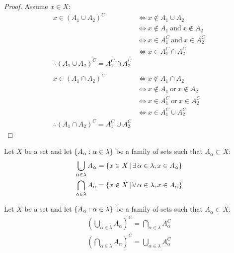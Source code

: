 \documentclass[letterpaper,12pt,fleqn]{article}
\renewcommand{\a}{\alpha}
\renewcommand{\l}{\lambda}
\begin{document}
\begin{proof}
  Assume \(x\in X\):
  \begin{align*}
    x\in(A_1\cup A_2)^C &\iff x\notin A_1\cup A_2 \\
    &\iff x\notin A_1\ \text{and}\ x\notin A_2 \\
    &\iff x\in A_1^C\ \text{and}\ x\in A_2^C \\
    &\iff x\in A_1^C\cap A_2^C \\
    \therefore(A_1\cup A_2)^C=A_1^C\cap A_2^C \\
    \\
    x\in(A_1\cap A_2)^C &\iff x\notin A_1\cap A_2 \\
    &\iff x\notin A_1\ \text{or}\ x\notin A_2 \\
    &\iff x\in A_1^C\ \text{or}\ x\in A_2^C \\
    &\iff x\in A_1^C\cup A_2^C \\
    \therefore(A_1\cap A_2)^C=A_1^C\cup A_2^C
  \end{align*}
\end{proof}

\begin{notation}
  Let \(X\) be a set and let \(\set{A_{\a}:\a\in\l}\) be a family of sets such that \(A_{\a}\subset X\):
  \begin{gather*}
    \bigcup_{\a\in\l}A_{\a}=\setb{x\in X}{\exists\,\a\in\l,x\in A_{\a}} \\
    \bigcap_{\a\in\l}A_{\a}=\setb{x\in X}{\forall\,\a\in\l,x\in A_{\a}}
  \end{gather*}
\end{notation}

\begin{theorem}
  Let \(X\) be a set and let \(\set{A_{\a}:\a\in\l}\) be a family of sets such that \(A_{\a}\subset X\):
  \begin{gather*}
    \left(\bigcup_{\a\in\l}A_{\a}\right)^C=\bigcap_{\a\in\l}A_{\a}^C \\
    \left(\bigcap_{\a\in\l}A_{\a}\right)^C=\bigcup_{\a\in\l}A_{\a}^C
  \end{gather*}
\end{theorem}
\end{document}
